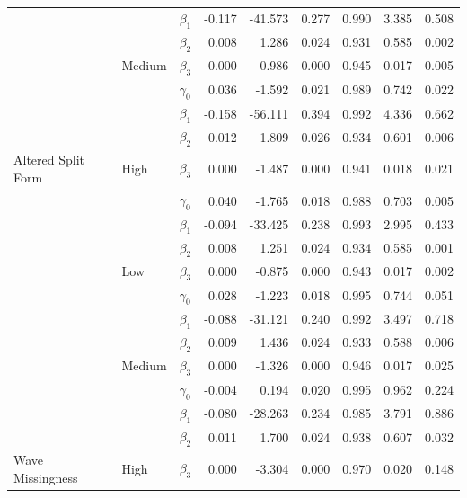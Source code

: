 \documentclass{svjour3}\usepackage[]{graphicx}\usepackage[]{color}
\newenvironment{knitrout}{}{} %
\begin{document}
\begin{knitrout}
\begin{table}[H]
{\begin{tabular}{l|l|l|r|r|r|r|r|r}
\cline{3-9}
 &  & $\beta_1$ & -0.117 & -41.573 & 0.277 & 0.990 & 3.385 & 0.508\\
\cline{3-9}
 &  & $\beta_2$ & 0.008 & 1.286 & 0.024 & 0.931 & 0.585 & 0.002\\
\cline{3-9}
 & \multirow{-4}{*}{\raggedright\arraybackslash Medium} & $\beta_3$ & 0.000 & -0.986 & 0.000 & 0.945 & 0.017 & 0.005\\
\cline{2-9}
 &  & $\gamma_0$ & 0.036 & -1.592 & 0.021 & 0.989 & 0.742 & 0.022\\
\cline{3-9}
 &  & $\beta_1$ & -0.158 & -56.111 & 0.394 & 0.992 & 4.336 & 0.662\\
\cline{3-9}
 &  & $\beta_2$ & 0.012 & 1.809 & 0.026 & 0.934 & 0.601 & 0.006\\
\cline{3-9}
\multirow{-12}{*}{\raggedright\arraybackslash Altered Split Form} & \multirow{-4}{*}{\raggedright\arraybackslash High} & $\beta_3$ & 0.000 & -1.487 & 0.000 & 0.941 & 0.018 & 0.021\\
\cline{1-9}
 &  & $\gamma_0$ & 0.040 & -1.765 & 0.018 & 0.988 & 0.703 & 0.005\\
\cline{3-9}
 &  & $\beta_1$ & -0.094 & -33.425 & 0.238 & 0.993 & 2.995 & 0.433\\
\cline{3-9}
 &  & $\beta_2$ & 0.008 & 1.251 & 0.024 & 0.934 & 0.585 & 0.001\\
\cline{3-9}
 & \multirow{-4}{*}{\raggedright\arraybackslash Low} & $\beta_3$ & 0.000 & -0.875 & 0.000 & 0.943 & 0.017 & 0.002\\
\cline{2-9}
 &  & $\gamma_0$ & 0.028 & -1.223 & 0.018 & 0.995 & 0.744 & 0.051\\
\cline{3-9}
 &  & $\beta_1$ & -0.088 & -31.121 & 0.240 & 0.992 & 3.497 & 0.718\\
\cline{3-9}
 &  & $\beta_2$ & 0.009 & 1.436 & 0.024 & 0.933 & 0.588 & 0.006\\
\cline{3-9}
 & \multirow{-4}{*}{\raggedright\arraybackslash Medium} & $\beta_3$ & 0.000 & -1.326 & 0.000 & 0.946 & 0.017 & 0.025\\
\cline{2-9}
 &  & $\gamma_0$ & -0.004 & 0.194 & 0.020 & 0.995 & 0.962 & 0.224\\
\cline{3-9}
 &  & $\beta_1$ & -0.080 & -28.263 & 0.234 & 0.985 & 3.791 & 0.886\\
\cline{3-9}
 &  & $\beta_2$ & 0.011 & 1.700 & 0.024 & 0.938 & 0.607 & 0.032\\
\cline{3-9}
\multirow{-12}{*}{\raggedright\arraybackslash Wave Missingness} & \multirow{-4}{*}{\raggedright\arraybackslash High} & $\beta_3$ & 0.000 & -3.304 & 0.000 & 0.970 & 0.020 & 0.148\\
\hline
\end{tabular}}
\end{table}


\end{knitrout}
\end{document}
